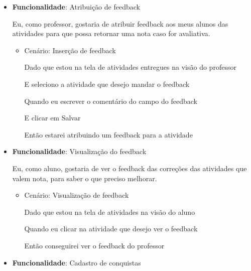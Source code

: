 \begin{itemize}
\item\textbf{Funcionalidade}: Atribuição de \gls{feedback}
    
    Eu, como professor, gostaria de atribuir \gls{feedback} aos meus alunos das atividades para que possa retornar uma nota caso for avaliativa.
    \begin{itemize}
        \item Cenário: Inserção de \gls{feedback}
        \par Dado que estou na tela de atividades entregues na visão do professor
        \par E seleciono a atividade que desejo mandar o feedback
        \par Quando eu escrever o comentário do campo do feedback
        \par E clicar em Salvar
        \par Então estarei atribuindo um feedback para a atividade
    \end{itemize}

\item\textbf{Funcionalidade}: Visualização do \gls{feedback}
    
    Eu, como aluno, gostaria de ver o \gls{feedback} das correções das atividades que valem nota, para saber o que preciso melhorar.
    \begin{itemize}
        \item Cenário: Visualização de \gls{feedback}
        \par Dado que estou na tela de atividades na visão do aluno
        \par Quando eu clicar na atividade que desejo ver o feedback
        \par Então conseguirei ver o feedback do professor
    \end{itemize}

\item\textbf{Funcionalidade}: Cadastro de conquistas
    

\end{itemize}
